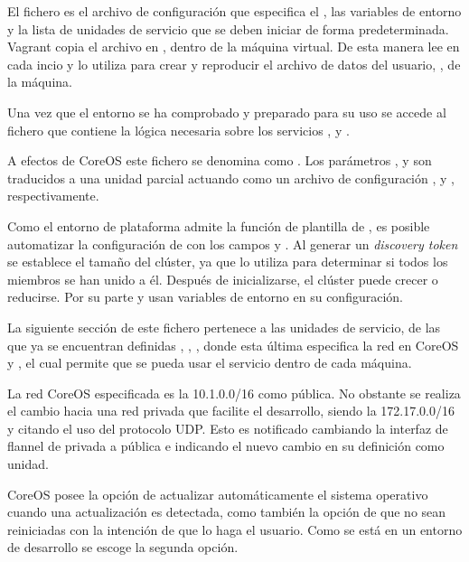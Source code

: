 El fichero  es el archivo de configuración  que especifica el , las variables de entorno y la lista de unidades de servicio que se deben iniciar de forma predeterminada. Vagrant copia el archivo  en , dentro de la máquina virtual. De esta manera  lee  en cada incio y lo utiliza para crear y reproducir el archivo de datos del usuario, , de la máquina.

Una vez que el entorno se ha comprobado y preparado para su uso se accede al fichero  que contiene la lógica necesaria sobre los servicios ,  y .

A efectos de CoreOS este fichero se denomina como . Los parámetros ,  y  son traducidos a una unidad  parcial actuando como un archivo de configuración ,  y , respectivamente. 

Como el entorno de plataforma admite la función de plantilla de , es posible automatizar la configuración de  con los campos  y . Al generar un \textit{discovery token} se establece el tamaño del clúster, ya que  lo utiliza para determinar si todos los miembros se han unido a él. Después de inicializarse, el clúster puede crecer o reducirse. Por su parte  y  usan variables de entorno en su configuración.

La siguiente sección de este fichero pertenece a las unidades de servicio, de las que ya se encuentran definidas , , , donde esta última especifica la red en CoreOS y , el cual permite que se pueda usar el servicio  dentro de cada máquina.

La red CoreOS especificada es la 10.1.0.0/16 como pública. No obstante se realiza el cambio hacia una red privada que facilite el desarrollo, siendo la 172.17.0.0/16 y citando el uso del protocolo UDP. Esto es notificado cambiando la interfaz de flannel de privada a pública e indicando el nuevo cambio en su definición como unidad.

CoreOS posee la opción de actualizar automáticamente el sistema operativo cuando una actualización es detectada, como también la opción de que no sean reiniciadas con la intención de que lo haga el usuario. Como se está en un entorno de desarrollo se escoge la segunda opción.

